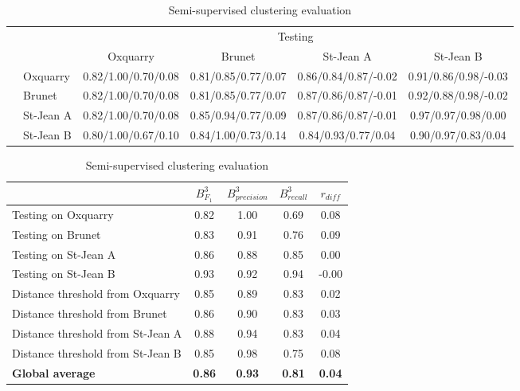 \begin{table}
  \centering
  \caption{Semi-supervised clustering evaluation}
  \label{tab:semi_supervised_clustering}

  \label{tab:semi_supervised_clustering_train_test}
  \begin{tabular}{l l| c c c c}
    \toprule
    \multicolumn{2}{c}{\multirow{2}{*}{}} & \multicolumn{4}{c}{Testing} \\
    \multicolumn{2}{c}{} & Oxquarry & Brunet & St-Jean A & St-Jean B \\
    \midrule
    \parbox[t]{2mm}{}
    & Oxquarry
    & 0.82/1.00/0.70/0.08
    & 0.81/0.85/0.77/0.07
    & 0.86/0.84/0.87/-0.02
    & 0.91/0.86/0.98/-0.03
    \\
    & Brunet
    & 0.82/1.00/0.70/0.08
    & 0.81/0.85/0.77/0.07
    & 0.87/0.86/0.87/-0.01
    & 0.92/0.88/0.98/-0.02
    \\
    & St-Jean A
    & 0.82/1.00/0.70/0.08
    & 0.85/0.94/0.77/0.09
    & 0.87/0.86/0.87/-0.01
    & 0.97/0.97/0.98/0.00
    \\
    & St-Jean B
    & 0.80/1.00/0.67/0.10
    & 0.84/1.00/0.73/0.14
    & 0.84/0.93/0.77/0.04
    & 0.90/0.97/0.83/0.04
    \\
    \bottomrule
  \end{tabular}

  \vspace{0.5cm}

  \label{tab:semi_supervised_clustering_average}
  \begin{tabular}{l c c c c}
    \toprule
    & $B^{3}_{F_1}$
    & $B^{3}_{precision}$
    & $B^{3}_{recall}$
    & $r_{diff}$ \\
    \midrule
    Testing on Oxquarry               & 0.82 & 1.00 & 0.69 &  0.08 \\
    Testing on Brunet                 & 0.83 & 0.91 & 0.76 &  0.09 \\
    Testing on St-Jean A              & 0.86 & 0.88 & 0.85 &  0.00 \\
    Testing on St-Jean B              & 0.93 & 0.92 & 0.94 & -0.00 \\
    Distance threshold from Oxquarry  & 0.85 & 0.89 & 0.83 & 0.02 \\
    Distance threshold from Brunet    & 0.86 & 0.90 & 0.83 & 0.03 \\
    Distance threshold from St-Jean A & 0.88 & 0.94 & 0.83 & 0.04 \\
    Distance threshold from St-Jean B & 0.85 & 0.98 & 0.75 & 0.08 \\
    \textbf{Global average} & \textbf{0.86} & \textbf{0.93} & \textbf{0.81} & \textbf{0.04} \\
    \bottomrule
  \end{tabular}
\end{table}

